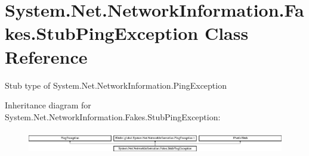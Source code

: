 \hypertarget{class_system_1_1_net_1_1_network_information_1_1_fakes_1_1_stub_ping_exception}{\section{System.\-Net.\-Network\-Information.\-Fakes.\-Stub\-Ping\-Exception Class Reference}
\label{class_system_1_1_net_1_1_network_information_1_1_fakes_1_1_stub_ping_exception}
}


Stub type of System.\-Net.\-Network\-Information.\-Ping\-Exception 


Inheritance diagram for System.\-Net.\-Network\-Information.\-Fakes.\-Stub\-Ping\-Exception\-:\begin{figure}[H]
\begin{center}
\leavevmode
\includegraphics[height=1.011743cm]{class_system_1_1_net_1_1_network_information_1_1_fakes_1_1_stub_ping_exception}
\end{center}
\end{figure}
